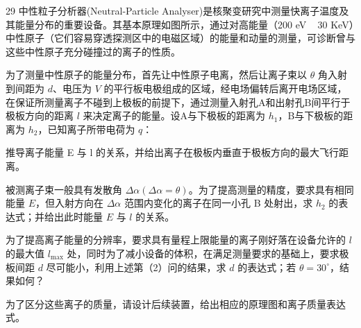 \begin{problem}[理论考试][中性粒子分析器]{29}
  中性粒子分析器(Neutral-Particle Analyser)是核聚变研究中测量快离子温度及其能量分布的重要设备。其基本原理如图所示，通过对高能量（200 eV ~ 30 KeV）中性原子（它们容易穿透探测区中的电磁区域）的能量和动量的测量，可诊断曾与这些中性原子充分碰撞过的离子的性质。

  为了测量中性原子的能量分布，首先让中性原子电离，然后让离子束以 $\theta$ 角入射到间距为 $d$、电压为 $V$ 的平行板电极组成的区域，经电场偏转后离开电场区域，在保证所测量离子不碰到上极板的前提下，通过测量入射孔A和出射孔B间平行于极板方向的距离 $l$ 来决定离子的能量。设A与下极板的距离为 $h_1$，B与下极板的距离为 $h_2$，已知离子所带电荷为 $q$：
  \begin{subproblem}
    推导离子能量 E 与 l 的关系，并给出离子在极板内垂直于极板方向的最大飞行距离。
  \end{subproblem}
  \begin{subproblem}
    被测离子束一般具有发散角 $\Delta \alpha (\Delta \alpha = \theta)$。为了提高测量的精度，要求具有相同能量 $E$，但入射方向在 $\Delta \alpha$ 范围内变化的离子在同一小孔 B 处射出，求 $h_2$ 的表达式；并给出此时能量 $E$ 与 $l$ 的关系。
  \end{subproblem}
  \begin{subproblem}
    为了提高离子能量的分辨率，要求具有量程上限能量的离子刚好落在设备允许的 $l$ 的最大值 $l_{\mathrm{max}}$ 处，同时为了减小设备的体积，在满足测量要求的基础上，要求极板间距 $d$ 尽可能小，利用上述第（2）问的结果，求 $d$ 的表达式；若 $\theta = 30^{\circ}$，结果如何？
  \end{subproblem}
  \begin{subproblem}
    为了区分这些离子的质量，请设计后续装置，给出相应的原理图和离子质量表达式。
  \end{subproblem}
\end{problem}